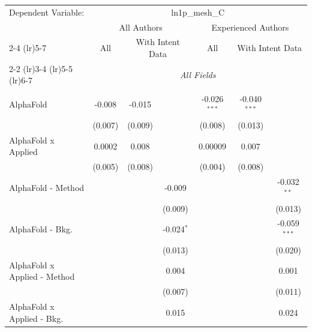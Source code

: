 \begingroup
\centering
\begin{tabular}{lcccccc}
   \tabularnewline \midrule \midrule
   Dependent Variable: & \multicolumn{6}{c}{ln1p\_mesh\_C}\\
 & \multicolumn{3}{c}{All Authors} & \multicolumn{3}{c}{Experienced Authors} \\
\cmidrule(lr){2-4} \cmidrule(lr){5-7}
 & \multicolumn{1}{c}{All} & \multicolumn{2}{c}{With Intent Data} & \multicolumn{1}{c}{All} & \multicolumn{2}{c}{With Intent Data} \\
\cmidrule(lr){2-2} \cmidrule(lr){3-4} \cmidrule(lr){5-5} \cmidrule(lr){6-7}
 & \multicolumn{6}{c}{\textit{All Fields}} \\ \\
   AlphaFold                      & -0.008         & -0.015         &                & -0.026$^{***}$ & -0.040$^{***}$ &   \\   
                                  & (0.007)        & (0.009)        &                & (0.008)        & (0.013)        &   \\   
   AlphaFold x Applied            & 0.0002         & 0.008          &                & 0.00009        & 0.007          &   \\   
                                  & (0.005)        & (0.008)        &                & (0.004)        & (0.008)        &   \\   
   AlphaFold - Method             &                &                & -0.009         &                &                & -0.032$^{**}$\\   
                                  &                &                & (0.009)        &                &                & (0.013)\\   
   AlphaFold - Bkg.               &                &                & -0.024$^{*}$   &                &                & -0.059$^{***}$\\   
                                  &                &                & (0.013)        &                &                & (0.020)\\   
   AlphaFold x Applied - Method   &                &                & 0.004          &                &                & 0.001\\   
                                  &                &                & (0.007)        &                &                & (0.011)\\   
   AlphaFold x Applied - Bkg.     &                &                & 0.015          &                &                & 0.024\\   

\end{tabular}
